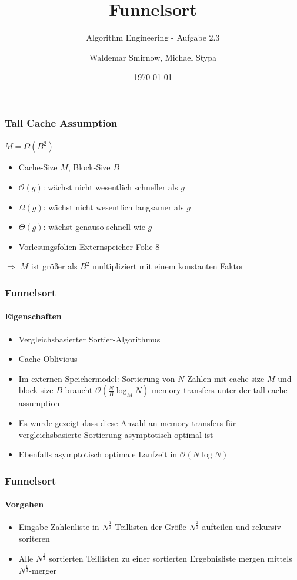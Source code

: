 \documentclass{beamer}
\title{Funnelsort}
\subtitle{Algorithm Engineering - Aufgabe 2.3}
\author{Waldemar Smirnow, Michael Stypa}
\institute{Universität Osnabrück}
\date{\today}
\begin{document}
\begin{frame}
  \titlepage
\end{frame}

\begin{frame}
  \frametitle{Tall Cache Assumption}
  \framesubtitle{}
  \begin{center}
    \Large
    $M = \Omega\left(B^2\right)$
  \end{center}
  \begin{itemize}
    \item Cache-Size $M$, Block-Size $B$
    \item $\mathcal{O}\left(g\right)$: wächst nicht wesentlich schneller als $g$
    \item $\Omega\left(g\right)$: wächst nicht wesentlich langsamer als $g$
    \item $\Theta\left(g\right)$: wächst genauso schnell wie $g$
    \item Vorlesungsfolien Externspeicher Folie 8
  \end{itemize}
  $\Rightarrow$ $M$ ist größer als $B^2$ multipliziert mit einem konstanten Faktor
\end{frame}

\begin{frame}
  \frametitle{Funnelsort}
  \framesubtitle{Eigenschaften}
  \begin{itemize}
    \item Vergleichsbasierter Sortier-Algorithmus
    \item Cache Oblivious
    \item Im externen Speichermodel: Sortierung von $N$ Zahlen
      mit cache-size $M$ und block-size $B$
      braucht $\mathcal{O}\left(\frac{N}{B}\log_M{N}\right)$ memory transfers
      unter der tall cache assumption
    \item Es wurde gezeigt dass diese Anzahl an memory transfers
      für vergleichsbasierte Sortierung asymptotisch optimal ist
    \item Ebenfalls asymptotisch optimale Laufzeit in $\mathcal{O}\left(N\log{N}\right)$
  \end{itemize}
\end{frame}

\begin{frame}
  \frametitle{Funnelsort}
  \framesubtitle{Vorgehen}
  \begin{itemize}
    \item Eingabe-Zahlenliste in $N^{\frac{1}{3}}$ Teillisten
      der Größe $N^{\frac{2}{3}}$ aufteilen und rekursiv soriteren
    \item Alle $N^{\frac{1}{3}}$ sortierten Teillisten zu einer
      sortierten Ergebnisliste mergen mittels $N^{\frac{1}{3}}$-merger
  \end{itemize}
\end{frame}
\end{document}
